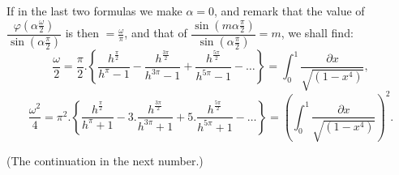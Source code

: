 \documentclass{article}
\begin{document}
If in the last two formulas we make $\alpha=0$, and remark that the value of $\dfrac{\varphi\left(\alpha\frac{\omega}{2}\right)}{\sin\left(\alpha\frac{\pi}{2}\right)}$ is then $=\frac{\omega}{\pi}$, and that of $\dfrac{\sin\left(m\alpha\frac{\pi}{2}\right)}{\sin\left(\alpha\frac{\pi}{2}\right)}=m$, we shall find:
\[
\frac{\omega}{2} = \frac{\pi}{2}.\left\{\frac{h^{\frac{\pi}{2}}}{h^{\pi}-1}-\frac{h^{\frac{3\pi}{2}}}{h^{3\pi}-1}+\frac{h^{\frac{5\pi}{2}}}{h^{5\pi}-1}-\ldots\right\} = \int_{0}^{1}\frac{\partial x}{\sqrt{(1-x^{4})}},
\]
\[
\frac{\omega^{2}}{4} = \pi^{2}.\left\{\frac{h^{\frac{\pi}{2}}}{h^{\pi}+1}-3.\frac{h^{\frac{3\pi}{2}}}{h^{3\pi}+1}+5.\frac{h^{\frac{5\pi}{2}}}{h^{5\pi}+1}-\ldots\right\} = \left(\int_{0}^{1}\frac{\partial x}{\sqrt{(1-x^{4})}}\right)^{2}.
\]

(The continuation in the next number.)
\end{document}
